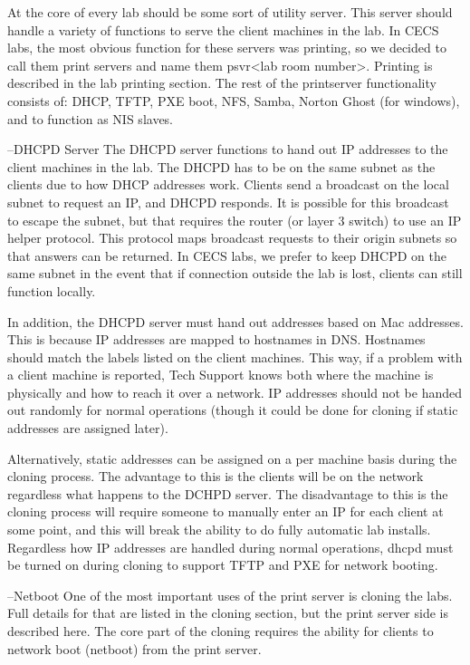 At the core of every lab should be some sort of utility server.  This server should handle a variety of functions to serve the client machines in the lab.  In CECS labs, the most obvious function for these servers was printing, so we decided to call them print servers and name them psvr<lab room number>.  Printing is described in the lab printing section.  The rest of the printserver functionality consists of:  DHCP, TFTP, PXE boot, NFS, Samba, Norton Ghost (for windows), and to function as NIS slaves.

--DHCPD Server
The DHCPD server functions to hand out IP addresses to the client machines in the lab.  The DHCPD has to be on the same subnet as the clients due to how DHCP addresses work.  Clients send a broadcast on the local subnet to request an IP, and DHCPD responds.  It is possible for this broadcast to escape the subnet, but that requires the router (or layer 3 switch) to use an IP helper protocol.  This protocol maps broadcast requests to their origin subnets so that answers can be returned.  In CECS labs, we prefer to keep DHCPD on the same subnet in the event that if connection outside the lab is lost, clients can still function locally.  

In addition, the DHCPD server must hand out addresses based on Mac addresses.  This is because IP addresses are mapped to hostnames in DNS.  Hostnames should match the labels listed on the client machines.  This way, if a problem with a client machine is reported, Tech Support knows both where the machine is physically and how to reach it over a network.  IP addresses should not be handed out randomly for normal operations (though it could be done for cloning if static addresses are assigned later).  

Alternatively, static addresses can be assigned on a per machine basis during the cloning process.  The advantage to this is the clients will be on the network regardless what happens to the DCHPD server.  The disadvantage to this is the cloning process will require someone to manually enter an IP for each client at some point, and this will break the ability to do fully automatic lab installs.   Regardless how IP addresses are handled during normal operations, dhcpd must be turned on during cloning to support TFTP and PXE for network booting.  

--Netboot
One of the most important uses of the print server is cloning the labs.  Full details for that are listed in the cloning section, but the print server side is described here.  The core part of the cloning requires the ability for clients to network boot (netboot) from the print server.  

